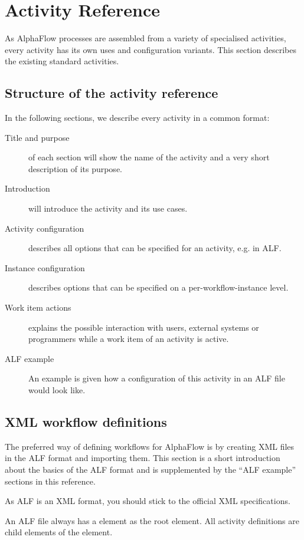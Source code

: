 \chapter{Activity Reference}\label{sec:activityref}

As AlphaFlow processes are assembled from a variety of specialised activities,
every activity has its own uses and configuration variants. This section
describes the existing standard activities.


\section{Structure of the activity reference}

In the following sections, we describe every activity in a common format:

\begin{description}
    \item[Title and purpose] of each section will show the name of the activity and a very short 
        description of its purpose.
    \item[Introduction] will introduce the activity and its use cases.
    \item[Activity configuration] describes all options that can be specified for an activity, e.g. in ALF.
    \item[Instance configuration] describes options that can be specified on a per-workflow-instance level.
    \item[Work item actions] explains the possible interaction with users, external systems or programmers while a work item of an activity is active. 
    \item[ALF example] An example is given how a configuration of this activity in an ALF file would look like.
\end{description}

\section{XML workflow definitions}

The preferred way of defining workflows for AlphaFlow is by creating XML files
in the ALF format and importing them. This section is a short introduction
about the basics of the ALF format and is supplemented by the ``ALF example''
sections in this reference.

As ALF is an XML format, you should stick to the official XML specifications.

An ALF file always has a  element as the root element.  All
activity definitions are child elements of the  element.


